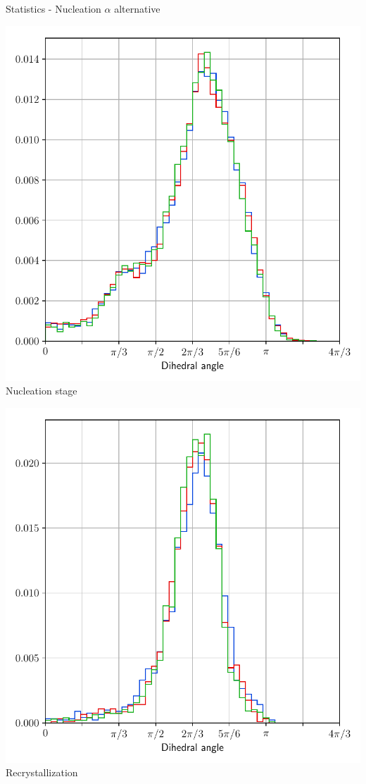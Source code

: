 \documentclass[usenames,dvipsnames]{beamer}
\begin{document}
\begin{frame}{Statistics - Nucleation $\alpha$ alternative}
\small
    \begin{minipage}{0.5\textwidth}
    \centering
    \includegraphics[scale=0.35]{figures/stored_energy/SE/dihedral/000110_nuclalternative_set.pdf}\\
    Nucleation stage
    \end{minipage}%
    \begin{minipage}{0.5\textwidth}
    \centering
    \includegraphics[scale=0.35]{figures/stored_energy/SE/dihedral/000240_nuclalternative_set.pdf}\\
    Recrystallization
    \end{minipage}
\end{frame}
\end{document}
